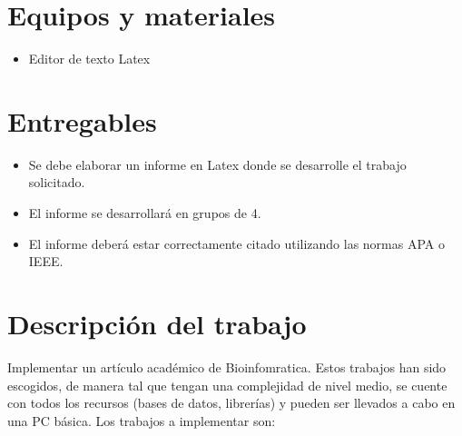 \documentclass{article}
\begin{document}
\section{Equipos y materiales}
\begin{itemize}
	\item Editor de texto  Latex 
\end{itemize}

\section{Entregables}
\begin{itemize}
	\item Se debe elaborar un informe en Latex donde se desarrolle el trabajo solicitado.
	\item El informe se desarrollará en grupos de 4.
	\item El informe deberá estar correctamente citado utilizando las normas APA o IEEE.
\end{itemize}



\clearpage

\section{Descripción del trabajo}

Implementar un artículo académico de Bioinfomratica. Estos trabajos han sido escogidos, de manera tal que tengan una complejidad de nivel medio, se cuente con todos los recursos (bases de datos, librerías) y pueden ser llevados a cabo en una PC básica. Los trabajos a implementar son:
\end{document}
